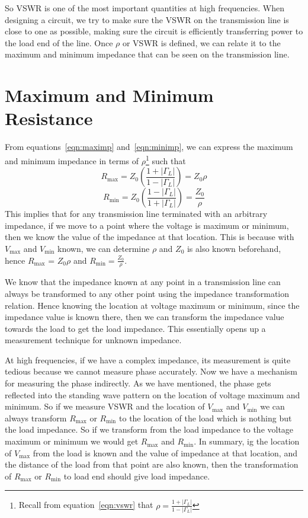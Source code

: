So VSWR is one of the most important quantities at high frequencies. When designing a circuit, we try to make sure the VSWR on the transmission line is close to one as possible, making sure the circuit is efficiently transferring power to the load end of the line. Once $\rho$ or VSWR is defined, we can relate it to the maximum and minimum impedance that can be seen on the transmission line.

\section{Maximum and Minimum Resistance}
From equations~\eqref{eqn:maximp} and~\eqref{eqn:minimp}, we can express the maximum and minimum impedance in terms of $\rho$\footnote{
Recall from equation~\eqref{eqn:vswr} that $\rho = \frac{1 + |\Gamma_L|}{1 - |\Gamma_L|}$
} such that
\begin{dmath}
R_{\max} = Z_0 \left(\frac{1 + |\Gamma_L|}{1 - |\Gamma_L|}\right)
= Z_0\rho
\label{eqn:maximprho}
\end{dmath}
\begin{dmath}
R_{\min} = Z_0 \left(\frac{1 - |\Gamma_L|}{1 + |\Gamma_L|}\right) 
=\frac{Z_0}{\rho}
\label{eqn:minimprho}
\end{dmath}
This implies that for any transmission line terminated with an arbitrary impedance, if we move to a point where the voltage is maximum or minimum, then we know the value of the impedance at that location. This is because with $V_{\max}$ and $V_{\min}$ known, we can determine $\rho$ and $Z_0$ is also known beforehand, hence $R_{\max}$ = $Z_0 \rho$ and $R_{\min} = \frac{Z_0}{\rho}$.

We know that the impedance known at any point in a transmission line can always be transformed to any other point using the impedance transformation relation. Hence knowing the location at voltage maximum or minimum, since the impedance value is known there, then we can transform the impedance value towards the load to get the load impedance. This essentially opens up a measurement technique for unknown impedance.

At high frequencies, if we have a complex impedance, its measurement is quite tedious because we cannot measure phase accurately. Now we have a mechanism for measuring the phase indirectly. As we have mentioned, the phase gets reflected into the standing wave pattern on the location of voltage maximum and minimum. So if we measure VSWR and the location of $V_{\max}$ and $V_{\min}$ we can always transform $R_{\max}$ or $R_{\min}$ to the location of the load which is nothing but the load impedance. So if we transform from the load impedance to the voltage maximum or minimum we would get $R_{\max}$ and $R_{\min}$. In summary, ig the location of $V_{\max}$ from the load is known and the value of impedance at that location, and the distance of the load from that point are also known, then the transformation of $R_{\max}$ or $R_{\min}$ to load end should give load impedance.



